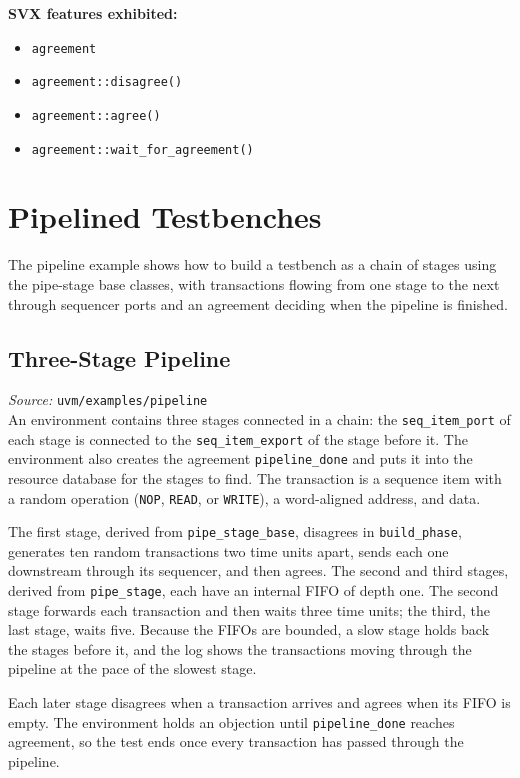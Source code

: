 \documentclass[11pt,letterpaper]{report}
\begin{document}
\textbf{SVX features exhibited:}

\begin{itemize}
  \item \texttt{agreement}
  \item \texttt{agreement::disagree()}
  \item \texttt{agreement::agree()}
  \item \texttt{agreement::wait\_for\_agreement()}
\end{itemize}
\chapter{Pipelined Testbenches}

The pipeline example shows how to build a testbench as a chain of stages using the pipe-stage base classes, with transactions flowing from one stage to the next through sequencer ports and an agreement deciding when the pipeline is finished.

\section{Three-Stage Pipeline}

\textit{Source:} \texttt{uvm/examples/pipeline}\\

An environment contains three stages connected in a chain: the \texttt{seq\_item\_port} of each stage is connected to the \texttt{seq\_item\_export} of the stage before it. The environment also creates the agreement \texttt{pipeline\_done} and puts it into the resource database for the stages to find. The transaction is a sequence item with a random operation (\texttt{NOP}, \texttt{READ}, or \texttt{WRITE}), a word-aligned address, and data.

The first stage, derived from \texttt{pipe\_stage\_base}, disagrees in \texttt{build\_phase}, generates ten random transactions two time units apart, sends each one downstream through its sequencer, and then agrees. The second and third stages, derived from \texttt{pipe\_stage}, each have an internal FIFO of depth one. The second stage forwards each transaction and then waits three time units; the third, the last stage, waits five. Because the FIFOs are bounded, a slow stage holds back the stages before it, and the log shows the transactions moving through the pipeline at the pace of the slowest stage.

Each later stage disagrees when a transaction arrives and agrees when its FIFO is empty. The environment holds an objection until \texttt{pipeline\_done} reaches agreement, so the test ends once every transaction has passed through the pipeline.
\end{document}
